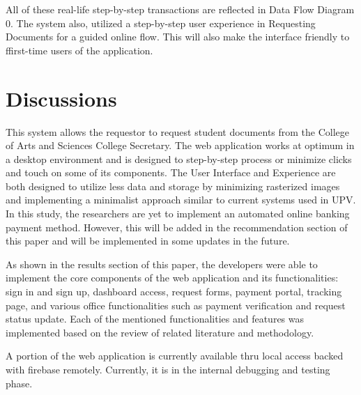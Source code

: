All of these real-life step-by-step transactions are reflected in Data Flow Diagram 0. The system also, utilized a step-by-step user experience in Requesting Documents for a guided online flow. This will also make the interface friendly to ffirst-time users of the application. 




\section{Discussions}

This system allows the requestor to request student documents from the College of Arts and Sciences College Secretary. The web application works at optimum in a desktop environment and is designed to step-by-step process or minimize clicks and touch on some of its components. The User Interface and Experience are both designed to utilize less data and storage by minimizing rasterized images and implementing a minimalist approach similar to current systems used in UPV. In this study, the researchers are yet to implement an automated online banking payment method. However, this will be added in the recommendation section of this paper and will be implemented in some updates in the future.

As shown in the results section of this paper, the developers were able to implement the core components of the web application and its functionalities: sign in and sign up, dashboard access, request forms, payment portal, tracking page, and various office functionalities such as payment verification and request status update. Each of the mentioned functionalities and features was implemented based on the review of related literature and methodology. 

A portion of the web application is currently available thru local access backed with firebase remotely. Currently, it is in the internal debugging and testing phase.



